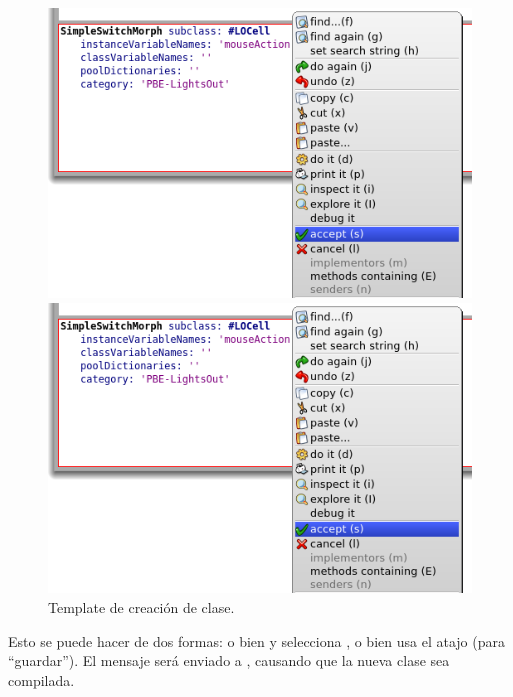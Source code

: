\documentclass[a4paper,10pt,twoside]{book}
\begin{document}
\begin{figure}[h!t]
\ifluluelse
  {\centerline {\includegraphics[width=\textwidth]{AcceptClassDef}}}
  {\centerline {\includegraphics[scale=0.7]{AcceptClassDef}}}
\caption{Template de creaci\'on de clase.
}
\end{figure}


Esto se puede hacer de dos formas: o bien \actclick y selecciona , o bien
usa el atajo  (para ``guardar'').
El mensaje ser\'a enviado a , causando que la nueva clase sea compilada.
\end{document}
